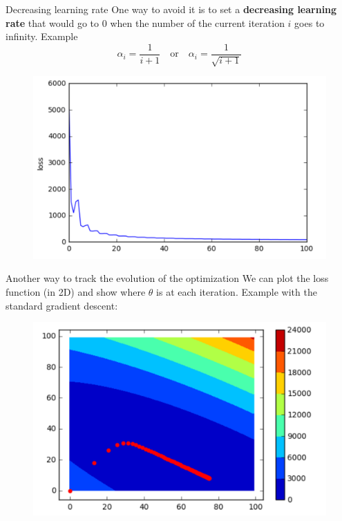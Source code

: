 \documentclass{beamer}
\newcommand{\1}[1]{\mathbbm{1}\left[#1\right]}
\begin{document}
\begin{frame}{Decreasing learning rate}
One way to avoid it is to set a \textbf{decreasing learning rate} that would go to 0 when the number of the current iteration $i$ goes to infinity. Example$$\alpha_i = \dfrac{1}{i+1} \quad \text{or} \quad \alpha_i = \dfrac{1}{\sqrt{i+1}}$$
\begin{figure}
\centering
\includegraphics[width=.8\linewidth]{images/sgd_decreasing_alpha.png}
\end{figure}
\end{frame}

\begin{frame}{Another way to track the evolution of the optimization}
We can plot the loss function (in 2D) and show where $\theta$ is at each iteration. Example with the standard gradient descent:
\begin{figure}
\centering
\includegraphics[width=\linewidth]{images/theta_evolution_gd.png}
\end{figure}
\end{frame}
\end{document}
